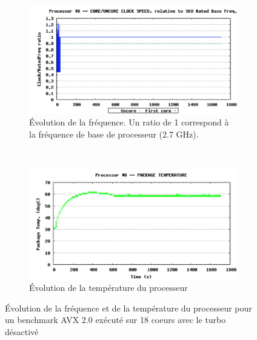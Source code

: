            
    \begin{figure}[!h]
        \centering
        \begin{subfigure}[t]{0.45\linewidth}
            \includegraphics[width=\linewidth]{images/kg_freq.png}
            \caption{Évolution de la fréquence. Un ratio de 1 correspond à la fréquence de base de processeur (2.7 GHz).}
            \label{pic_kg_freq}
        \end{subfigure}
        ~ %
        \begin{subfigure}[t]{0.45\linewidth}
            \includegraphics[width=\linewidth]{images/kg_temp.png}
            \caption{Évolution de la température du processeur}
            \label{pic_kg_temp}
        \end{subfigure}
        \caption{Évolution de la fréquence et de la température du processeur pour un benchmark AVX 2.0 exécuté sur 18 coeurs avec le turbo désactivé}\label{pic_kg_freq_vs_temp}
    \end{figure}

        




